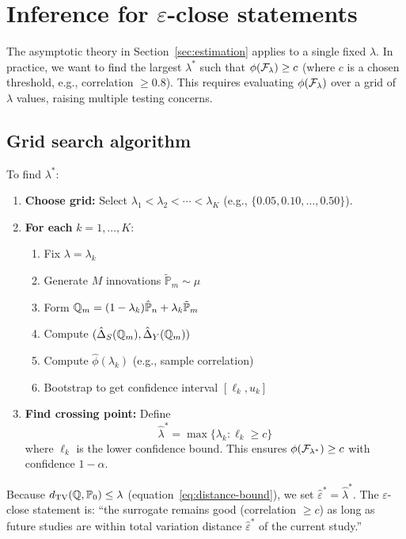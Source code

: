 \documentclass{article}
\newcommand{\PP}{\mathbb{P}}
\begin{document}
\section{Inference for $\varepsilon$-close statements}\label{sec:grid}

The asymptotic theory in Section~\ref{sec:estimation} applies to a single fixed
$\lambda$. In practice, we want to find the largest $\lambda^*$ such that
$\phi(\mathcal{F}_\lambda) \geq c$ (where $c$ is a chosen threshold, e.g., correlation
$\geq 0.8$). This requires evaluating $\phi(\mathcal{F}_\lambda)$ over a grid of $\lambda$
values, raising multiple testing concerns.

\subsection{Grid search algorithm}

To find $\lambda^*$:

\begin{enumerate}
    \item \textbf{Choose grid:} Select $\lambda_1 < \lambda_2 < \cdots < \lambda_K$
          (e.g., $\{0.05, 0.10, \ldots, 0.50\}$).

    \item \textbf{For each} $k = 1, \ldots, K$:
          \begin{enumerate}
              \item Fix $\lambda = \lambda_k$
              \item Generate $M$ innovations $\tilde{\PP}_m \sim \mu$
              \item Form $\Q_m = (1-\lambda_k)\hat{\PP}_n + \lambda_k\tilde{\PP}_m$
              \item Compute $(\hat{\Delta}_S(\mathbb{Q}_m), \hat{\Delta}_Y(\mathbb{Q}_m))$
              \item Compute $\hat{\phi}(\lambda_k)$ (e.g., sample correlation)
              \item Bootstrap to get confidence interval $[\ell_k, u_k]$
          \end{enumerate}

    \item \textbf{Find crossing point:} Define
          \[
              \hat{\lambda}^* = \max\{\lambda_k : \ell_k \geq c\}
          \]
          where $\ell_k$ is the lower confidence bound. This ensures
          $\phi(\mathcal{F}_{\lambda^*}) \geq c$ with confidence $1-\alpha$.
\end{enumerate}

Because $d_{\mathrm{TV}}(\Q, \PP_0) \leq \lambda$ (equation~\eqref{eq:distance-bound}),
we set $\hat{\varepsilon}^* = \hat{\lambda}^*$. The $\varepsilon$-close statement is:
``the surrogate remains good (correlation $\geq c$) as long as future studies are
within total variation distance $\hat{\varepsilon}^*$ of the current study.''
\end{document}
